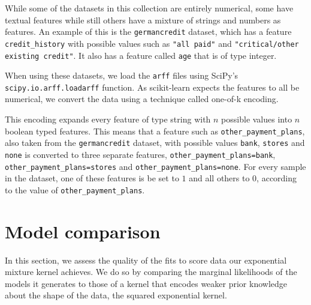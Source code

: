 \documentclass[a4paper,12pt,twoside,openright]{report}
\begin{document}
While some of the datasets in this collection are entirely numerical, some have textual features while still others have a mixture of strings and numbers as features. An example of this is the \texttt{germancredit} dataset, which has a feature \texttt{credit\_history} with possible values such as \texttt{"all paid"} and \texttt{"critical/other existing credit"}. It also has a feature called \texttt{age} that is of type integer.

When using these datasets, we load the \texttt{arff} files using SciPy's \texttt{scipy.io.arff.loadarff} function. As scikit-learn expects the features to all be numerical, we convert the data using a technique called one-of-k encoding.


This encoding expands every feature of type string with $n$ possible values into $n$ boolean typed features. This means that a feature such as \texttt{other\_payment\_plans}, also taken from the \texttt{germancredit} dataset, with possible values \texttt{bank}, \texttt{stores} and \texttt{none} is converted to three separate features, \texttt{other\_payment\_plans=bank}, \texttt{other\_payment\_plans=stores} and \texttt{other\_payment\_plans=none}. For every sample in the dataset, one of these features is be set to $1$ and all others to $0$, according to the value of \texttt{other\_payment\_plans}.



\section{Model comparison}
In this section, we assess the quality of the fits to score data our exponential mixture kernel achieves. We do so by comparing the marginal likelihoods of the models it generates to those of a kernel that encodes weaker prior knowledge about the shape of the data, the squared exponential kernel.


\end{document}
